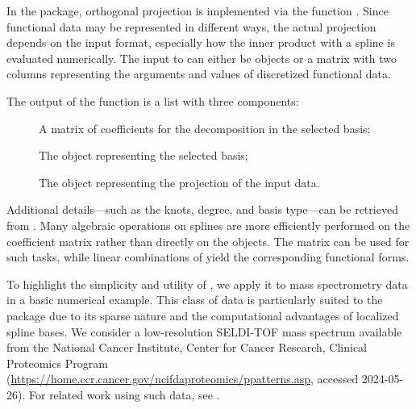 In the package, orthogonal projection is implemented via the function . 
Since functional data may be represented in different ways, the actual projection depends on the input format, especially how the inner product with a spline is evaluated numerically. 
The input to  can either be  objects or a matrix with two columns representing the arguments and values of discretized functional data.

The output of the function is a list with three components:
\begin{description}
\item[] A matrix of coefficients for the decomposition in the selected basis;
\item[] The  object representing the selected basis;
\item[] The  object representing the projection of the input data.
\end{description}

Additional details—such as the knots, degree, and basis type—can be retrieved from . 
Many algebraic operations on splines are more efficiently performed on the coefficient matrix rather than directly on the  objects. 
The matrix  can be used for such tasks, while linear combinations of  yield the corresponding functional forms.

To highlight the simplicity and utility of , we apply it to mass spectrometry data in a basic numerical example. 
This class of data is particularly suited to the package due to its sparse nature and the computational advantages of localized spline bases. 
We consider a low-resolution SELDI-TOF mass spectrum available from the National Cancer Institute, Center for Cancer Research, Clinical Proteomics Program (\url{https://home.ccr.cancer.gov/ncifdaproteomics/ppatterns.asp}, accessed 2024-05-26). 
For related work using such data, see \citet{Petricoin:2002aa}.

